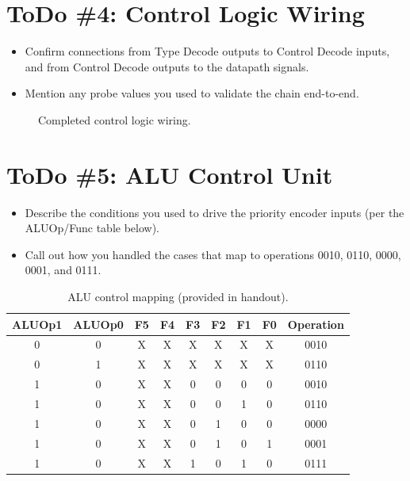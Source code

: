 \documentclass[11pt]{article}
\begin{document}
\section{ToDo \#4: Control Logic Wiring}
\begin{itemize}[leftmargin=*]
  \item Confirm connections from Type Decode outputs to Control Decode inputs, and from Control Decode outputs to the datapath signals.
  \item Mention any probe values you used to validate the chain end-to-end.
\end{itemize}

\begin{figure}[h]
  \centering
  \caption{Completed control logic wiring.}
\end{figure}

\section{ToDo \#5: ALU Control Unit}
\begin{itemize}[leftmargin=*]
  \item Describe the conditions you used to drive the priority encoder inputs (per the ALUOp/Func table below).
  \item Call out how you handled the cases that map to operations 0010, 0110, 0000, 0001, and 0111.
\end{itemize}

\begin{table}[h]
  \centering
  \caption{ALU control mapping (provided in handout).}
  \begin{tabular}{ccccccccc}
    \toprule
    ALUOp1 & ALUOp0 & F5 & F4 & F3 & F2 & F1 & F0 & Operation \\
    \midrule
    0 & 0 & X & X & X & X & X & X & 0010 \\
    0 & 1 & X & X & X & X & X & X & 0110 \\
    1 & 0 & X & X & 0 & 0 & 0 & 0 & 0010 \\
    1 & 0 & X & X & 0 & 0 & 1 & 0 & 0110 \\
    1 & 0 & X & X & 0 & 1 & 0 & 0 & 0000 \\
    1 & 0 & X & X & 0 & 1 & 0 & 1 & 0001 \\
    1 & 0 & X & X & 1 & 0 & 1 & 0 & 0111 \\
    \bottomrule
  \end{tabular}
\end{table}
\end{document}
